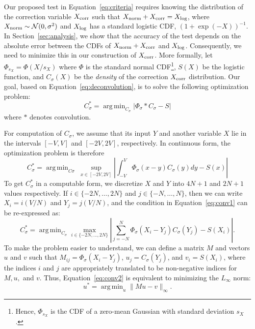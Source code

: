 \documentclass{article}
\DeclareMathOperator*{\argmin}{arg\,min}
\begin{document}
Our proposed test in Equation~\ref{eq:criteria} requires knowing the
distribution of the correction variable $X_{\rm corr}$ such that $X_{\rm norm} +
X_{\rm corr} = X_{\rm log}$, where $X_{\rm norm} \sim \mathcal{N}(0,\sigma^2)$
and $X_{\rm log}$ has a standard logistic CDF, $(1+\exp(-X))^{-1}$. In
Section~\ref{sec:analysis}, we show that the accuracy of the test depends on the
absolute error between the CDFs of $X_{\rm norm} + X_{\rm corr}$ and $X_{\rm
log}$. Consequently, we need to minimize this in our construction of $X_{\rm
corr}$. More formally, let $\Phi_{s_X} = \Phi(X/s_X)$ where $\Phi$ is the
standard normal CDF\footnote{Hence, $\Phi_{s_X}$ is the CDF of a zero-mean
Gaussian with standard deviation $s_X$.}, $S(X)$ be the logistic function, and
$C_{\sigma}(X)$ be the \emph{density} of the correction $X_{\rm corr}$
distribution. Our goal, based on Equation~\ref{eq:deconvolution}, is to solve
the following optimization problem:
\begin{equation}\label{eq:overall_corr_problem}
    C_\sigma^* = \argmin_{C_\sigma} |\Phi_{\sigma} * C_{\sigma} - S|
\end{equation}
where $*$ denotes convolution.

For computation of $C_\sigma$, we assume that its input $Y$ and
another variable $X$ lie in the intervals $[-V,V]$ and $[-2V,2V]$, respectively.
In continuous form, the optimization problem is therefore
\begin{equation}\label{eq:conv1}
    C_\sigma^* = \argmin_{C\sigma} \; \sup_{x \in [-2V,2V]}\left|\int_{-V}^{V}\Phi_{\sigma}(x-y) C_{\sigma}(y)dy - S(x)\right|
\end{equation}
To get $C_\sigma^*$ in a computable form, we discretize $X$ and $Y$ into $4N+1$
and $2N+1$ values respectively. If $i \in \{-2N, \ldots, 2N\}$ and $j \in \{-N,
\ldots, N\}$, then we can write $X_i = i(V/N)$ and $Y_j = j(V/N)$, and the
condition in Equation~\ref{eq:conv1} can be re-expressed as:
\begin{equation}\label{eq:conv2}
    C_\sigma^* = \argmin_{C_\sigma} \max_{i \in \{-2N,\ldots,2N\}}\left|\sum_{j = -N}^{N}\Phi_{\sigma}(X_i-Y_j) C_{\sigma}(Y_j) - S(X_i)\right|.
\end{equation}
To make the problem easier to understand, we can define a matrix $M$ and vectors
$u$ and $v$ such that $M_{ij} = \Phi_{\sigma}(X_i-Y_j)$, $u_j =
C_{\sigma}(Y_j)$, and $v_i = S(X_i)$, where the indices $i$ and $j$ are
appropriately translated to be non-negative indices for $M, u,$ and $v$. Thus,
Equation~\ref{eq:conv2} is equivalent to minimizing the $L_{\infty}$ norm:
\begin{equation}\label{eq:optimization_l1}
    u^* = \argmin_{u} \|Mu-v\|_{\infty}.
\end{equation}
\end{document}
